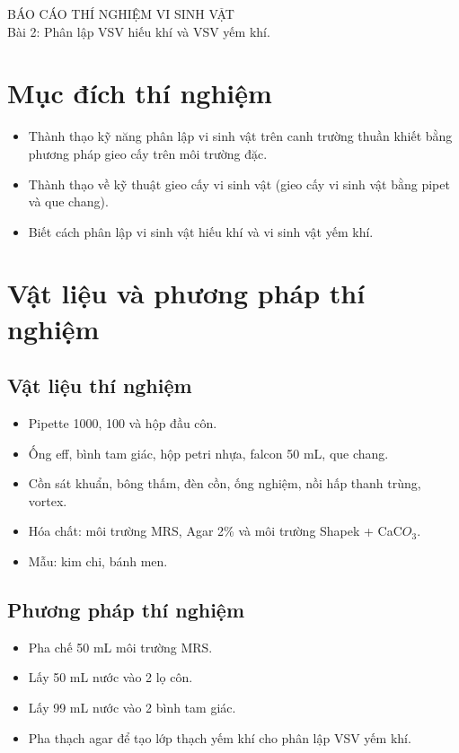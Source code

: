 \begin{center}
     \huge BÁO CÁO THÍ NGHIỆM VI SINH VẬT \\ \vspace{10pt}
  \huge Bài 2: Phân lập VSV hiếu khí và VSV yếm khí.
\end{center}

\section{Mục đích thí nghiệm}

\begin{itemize}
    \item Thành thạo kỹ năng phân lập vi sinh vật trên canh trường thuần khiết bằng phương pháp gieo cấy trên môi trường đặc.
    \item Thành thạo về kỹ thuật gieo cấy vi sinh vật (gieo cấy vi sinh vật bằng pipet và que chang).
    \item Biết cách phân lập vi sinh vật hiếu khí và vi sinh vật yếm khí.
\end{itemize}

\section{Vật liệu và phương pháp thí nghiệm}

\subsection{Vật liệu thí nghiệm}

\begin{itemize}
    \item Pipette 1000, 100 và hộp đầu côn.
    \item Ống eff, bình tam giác, hộp petri nhựa, falcon 50 mL, que chang.
    \item Cồn sát khuẩn, bông thấm, đèn cồn, ống nghiệm, nồi hấp thanh trùng, vortex.
    \item Hóa chất: môi trường MRS, Agar 2\% và môi trường Shapek + CaC$O_3$.
    \item Mẫu: kim chi, bánh men.
\end{itemize}

\subsection{Phương pháp thí nghiệm}

\begin{itemize}
    \item Pha chế 50 mL môi trường MRS.
    \item Lấy 50 mL nước vào 2 lọ côn.
    \item Lấy 99 mL nước vào 2 bình tam giác.
    \item Pha thạch agar để tạo lớp thạch yếm khí cho phân lập VSV yếm khí.
\end{itemize}

